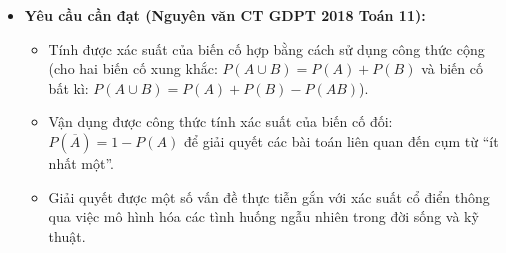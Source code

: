 \documentclass[12pt, a4paper]{article}
\begin{document}
\begin{itemize}[leftmargin=1.2cm]
    \item \textbf{Yêu cầu cần đạt (Nguyên văn CT GDPT 2018 Toán 11):}
    \begin{itemize}[leftmargin=0.6cm]
        \item Tính được xác suất của biến cố hợp bằng cách sử dụng công thức cộng (cho hai biến cố xung khắc: $P(A \cup B) = P(A) + P(B)$ và biến cố bất kì: $P(A \cup B) = P(A) + P(B) - P(AB)$).
        \item Vận dụng được công thức tính xác suất của biến cố đối: $P(\overline{A}) = 1 - P(A)$ để giải quyết các bài toán liên quan đến cụm từ ``ít nhất một''.
        \item Giải quyết được một số vấn đề thực tiễn gắn với xác suất cổ điển thông qua việc mô hình hóa các tình huống ngẫu nhiên trong đời sống và kỹ thuật.
    \end{itemize}


\end{itemize}
\end{document}
